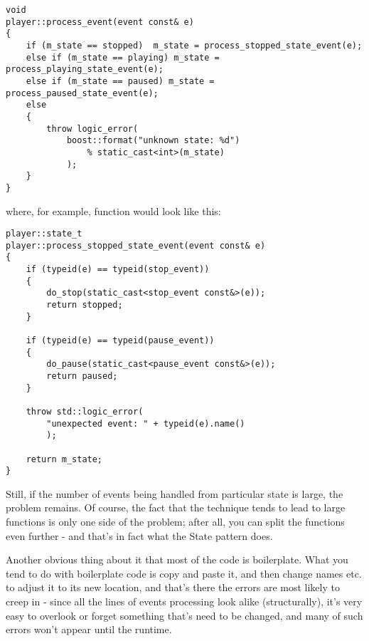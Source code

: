 \documentclass{kapproc}
\begin{document}

{\small
\begin{codesamp}\begin{verbatim}
void
player::process_event(event const& e)
{
    if (m_state == stopped)  m_state = process_stopped_state_event(e);
    else if (m_state == playing) m_state = process_playing_state_event(e);
    else if (m_state == paused) m_state = process_paused_state_event(e);
    else
    {
        throw logic_error(
            boost::format("unknown state: %d")
                % static_cast<int>(m_state)
            );
    }
}
\end{verbatim}
\end{codesamp}
}

where, for example,  
function would look like this:

{\small
\begin{codesamp}\begin{verbatim}
player::state_t
player::process_stopped_state_event(event const& e)
{
    if (typeid(e) == typeid(stop_event))
    {
        do_stop(static_cast<stop_event const&>(e));
        return stopped;
    }

    if (typeid(e) == typeid(pause_event))
    {
        do_pause(static_cast<pause_event const&>(e));
        return paused;
    }

    throw std::logic_error(
        "unexpected event: " + typeid(e).name()
        );

    return m_state;
}
\end{verbatim}
\end{codesamp}
}

Still, if the number of events being handled from particular 
state is large, the problem remains. Of course, the fact that 
the technique tends to lead to large functions is only one 
side of the problem; after all, you can split the functions 
even further - and that's in fact what the State pattern does.

Another obvious thing about it that most of the code is 
boilerplate. What you tend to do with boilerplate code is copy 
and paste it, and then change names etc. to adjust it to its new 
location, and that's there the errors are most likely to creep in
- since all the lines of events processing look alike 
(structurally), it's very easy to overlook or forget something 
that's need to be changed, and many of such errors won't appear 
until the runtime.
\end{document}
